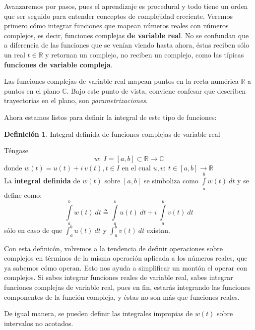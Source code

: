 \documentclass[12pt]{article}
\theoremstyle{definition}
\newtheorem{definition}{Definici\'on}[section]
\theoremstyle{theorem}
\theoremstyle{corolary}
\begin{document}
Avanzaremos por pasos, pues el aprendizaje es procedural y todo tiene un orden que ser seguido para entender conceptos de complejidad creciente. Veremos primero c\'omo integrar funciones que mapean n\'umeros reales con n\'umeros complejos, es decir, funciones complejas \textbf{de variable real}. No se confundan que a diferencia de las funciones que se ven\'ian viendo hasta ahora, \'estas reciben s\'olo un real $t \in \mathbb{R}$ y retornan un complejo, no reciben un complejo, como las t\'ipicas \textbf{funciones de variable compleja}.

Las funciones complejas de variable real mapean puntos en la recta num\'erica $\mathbb{R}$ a puntos en el plano $\mathbb{C}$. Bajo este punto de vista, conviene confesar que describen trayectorias en el plano, son \textit{parametrizaciones}.

Ahora estamos listos para definir la integral de este tipo de funciones:\\

\colorbox{orange!40!white!80}{\parbox{\linewidth}{
 \theoremstyle{definition}
 \begin{definition}{Integral definida de funciones complejas de variable real}

  	T\'engase $$w:\: I=[a, b] \subset \mathbb{R} \rightarrow \mathbb{C}$$donde $w(t) = u(t)+i\ v(t), t\in I$ en el cual $u, v :\: t\in[a, b] \rightarrow \mathbb{R}$\\
  	La \textbf{integral definida} de $w(t)$ sobre $[a,b]$ se simboliza como $\int\limits_a^b w(t)\ dt$ y se define como:
  	$$\int\limits_a^b w(t)\ dt \triangleq \int\limits_a^b u(t)\ dt + i\ \int\limits_a^b v(t)\ dt$$
  	s\'olo en caso de que $\int_a^b u(t)\ dt$ y $\int_a^b v(t)\ dt$ existan.
 \end{definition}}}
\linebreak
\linebreak

Con esta definic\'on, volvemos a la tendencia de definir operaciones sobre complejos en t\'erminos de la misma operaci\'on aplicada a los n\'umeros reales, que ya sabemos c\'omo operan. Esto nos ayuda a simplificar un mont\'on el operar con complejos. Si sabes integrar funciones reales de variable real, sabes integrar funciones complejas de variable real, pues en fin, estar\'as integrando las funciones componentes de la funci\'on compleja, y \'estas no son m\'as que funciones reales.

De igual manera, se pueden definir las integrales impropias de $w(t)$ sobre intervalos no acotados.\\
\end{document}
